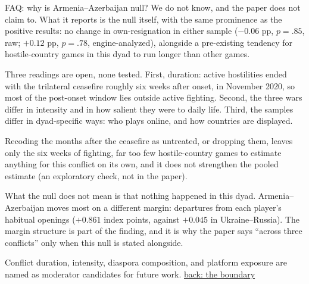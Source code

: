 \documentclass[aspectratio=169,11pt,t]{beamer}
\newcommand{\backto}[2]{\vfill\hfill\hyperlink{#1}{\textcolor{linkblue}{\scriptsize\textsf{back: #2}}}}
\begin{document}
\begin{frame}[label=faq-aa]{FAQ: why is Armenia--Azerbaijan null?}
  \footnotesize
  We do not know, and the paper does not claim to. What it reports is the null itself, with the same prominence as the positive results: no change in own-resignation in either sample ($-0.06$ pp, $p = .85$, raw; $+0.12$ pp, $p = .78$, engine-analyzed), alongside a pre-existing tendency for hostile-country games in this dyad to run longer than other games.

  Three readings are open, none tested. First, duration: active hostilities ended with the trilateral ceasefire roughly six weeks after onset, in November 2020, so most of the post-onset window lies outside active fighting. Second, the three wars differ in intensity and in how salient they were to daily life. Third, the samples differ in dyad-specific ways: who plays online, and how countries are displayed.

  Recoding the months after the ceasefire as untreated, or dropping them, leaves only the six weeks of fighting, far too few hostile-country games to estimate anything for this conflict on its own, and it does not strengthen the pooled estimate (an exploratory check, not in the paper).

  What the null does not mean is that nothing happened in this dyad. Armenia--Azerbaijan moves most on a different margin: departures from each player's habitual openings ($+0.861$ index points, against $+0.045$ in Ukraine--Russia). The margin structure is part of the finding, and it is why the paper says ``across three conflicts'' only when this null is stated alongside.

  Conflict duration, intensity, diaspora composition, and platform exposure are named as moderator candidates for future work.
  \backto{boundary}{the boundary}
\end{frame}
\end{document}
